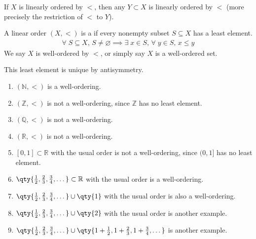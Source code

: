 \begin{note}
    If $X$ is linearly ordered by $<$, then any $Y \subset X$ is linearly ordered by $<$ (more precisely the restriction of $<$ to $Y$).
\end{note}

\begin{definition}
    A linear order $(X, <)$ is a  if every nonempty subset $S \subseteq X$ has a least element.
    \begin{align*}
       \forall \; S \subseteq X,\, S \neq \varnothing \implies \exists \; x \in S,\, \forall \; y \in S,\, x \leq y
    \end{align*}
    We say $X$ is well-ordered by $<$, or simply say $X$ is a well-ordered set.
\end{definition}

\begin{note}
    This least element is unique by antisymmetry.
\end{note}

\begin{example}
    \begin{enumerate}
        \item $(\mathbb N, <)$ is a well-ordering.
        \item $(\mathbb Z, <)$ is not a well-ordering, since $\mathbb Z$ has no least element.
        \item $(\mathbb Q, <)$ is not a well-ordering.
        \item $(\mathbb R, <)$ is not a well-ordering.
        \item $[0,1] \subset \mathbb R$ with the usual order is not a well-ordering, since $(0,1]$ has no least element.
        \item $\qty{\frac{1}{2}, \frac{2}{3}, \frac{3}{4}, \dots} \subset \mathbb R$ with the usual order is a well-ordering.
        \item $\qty{\frac{1}{2}, \frac{2}{3}, \frac{3}{4}, \dots} \cup \qty{1}$ with the usual order is also a well-ordering.
        \item $\qty{\frac{1}{2}, \frac{2}{3}, \frac{3}{4}, \dots} \cup \qty{2}$ with the usual order is another example.
        \item $\qty{\frac{1}{2}, \frac{2}{3}, \frac{3}{4}, \dots} \cup \qty{1 + \frac{1}{2}, 1 + \frac{2}{3}, 1 + \frac{3}{4}, \dots}$ is another example.
    \end{enumerate}
\end{example}

